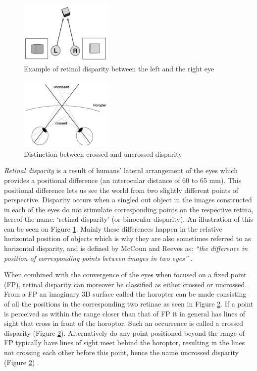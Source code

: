 \begin{figure}[h!]
   \centering
   \includegraphics[width=0.4\textwidth]{figures/cue11.jpg}
   \caption{Example of retinal disparity between the left and the right eye \cite{Retina}}\label{fig:cue11}
\end{figure}

\begin{figure}[h!]
   \centering
   \includegraphics[width=0.4\textwidth]{figures/cue12.jpg}
   \caption{Distinction between crossed and uncrossed disparity \cite{Heeger}}\label{fig:cue12}
\end{figure}

\textit{Retinal disparity} is a result of humans’ lateral arrangement of the eyes which provides a positional difference (an interocular distance of 60 to 65 mm). This positional difference lets us see the world from two slightly different points of perspective. Disparity occurs when a singled out object in the images constructed in each of the eyes do not stimulate corresponding points on the respective retina, hereof the name: ‘retinal disparity’ (or binocular disparity). An illustration of this can be seen on Figure \ref{fig:cue11}. Mainly these differences happen in the relative horizontal position of objects which is why they are also sometimes referred to as horizontal disparity, and is defined by McCoun and Reeves as: \textit{“the difference in position of corresponding points between images in two eyes”} \cite{McCoun2010}.

When combined with the convergence of the eyes when focused on a fixed point (FP), retinal disparity can moreover be classified as either crossed or uncrossed. From a FP an imaginary 3D surface called the horopter can be made consisting of all the positions in the corresponding two retinae as seen in Figure \ref{fig:cue12}. If a point is perceived as within the range closer than that of FP it in general has lines of sight that cross in front of the horoptor. Such an occurrence is called a crossed disparity (Figure \ref{fig:cue12}). Alternatively do any point positioned beyond the range of FP typically have lines of sight meet behind the horoptor, resulting in the lines not crossing each other before this point, hence the name uncrossed disparity (Figure \ref{fig:cue12}) \cite{McCoun2010}.


